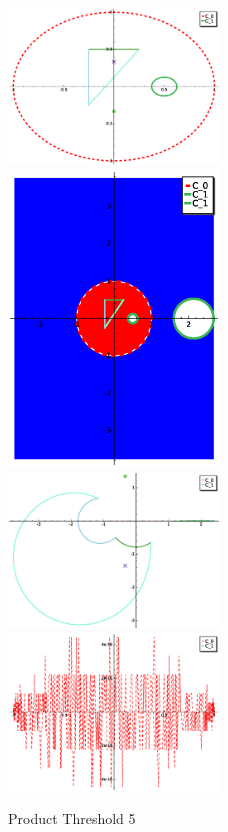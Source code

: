 \documentclass[a4paper,10pt]{article}
\begin{document}
\graphicspath{{./GE1LE2PT5/}}
\begin{figure}
\caption{Product Threshold 5}
\includegraphics[width=0.5\textwidth]{circle_plot.eps}
\includegraphics[width=0.5\textwidth]{Fundamental_domain.eps}
\includegraphics[width=0.5\textwidth]{zedplot.eps}
\includegraphics[width=0.5\textwidth]{zedplot_C0.eps}
\end{figure}
\end{document}
